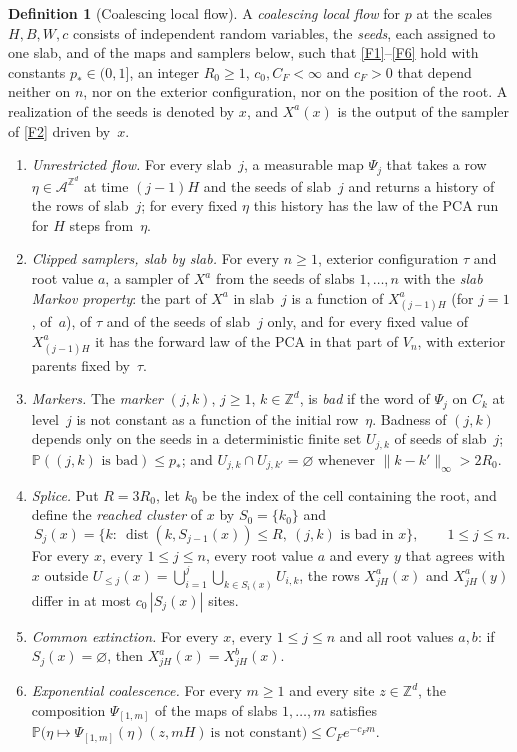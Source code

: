 \documentclass[11pt]{article}
\theoremstyle{plain}
\theoremstyle{definition}
\newtheorem{definition}[theorem]{Definition}
\theoremstyle{remark}
\newcommand{\A}{\mathcal{A}}
\newcommand{\Z}{\mathbb{Z}}
\newcommand{\Prob}{\mathbb{P}}
\newcommand{\dist}{\operatorname{dist}}
\begin{document}
\begin{definition}[Coalescing local flow]
\label{def:flow}
A \emph{coalescing local flow} for $p$ at the scales $H,B,W,c$ consists of independent random variables, the \emph{seeds}, each assigned to one slab, and of the maps and samplers below, such that \ref{F1}--\ref{F6} hold with constants $p_*\in(0,1]$, an integer $R_0\ge1$, $c_0,C_F<\infty$ and $c_F>0$ that depend neither on $n$, nor on the exterior configuration, nor on the position of the root. A realization of the seeds is denoted by $x$, and $X^a(x)$ is the output of the sampler of \ref{F2} driven by~$x$.
\begin{enumerate}[label=(F\arabic*)]
\item\label{F1} \emph{Unrestricted flow.} For every slab~$j$, a measurable map $\Psi_j$ that takes a row $\eta\in\A^{\Z^d}$ at time $(j-1)H$ and the seeds of slab~$j$ and returns a history of the rows of slab~$j$; for every fixed $\eta$ this history has the law of the PCA run for $H$ steps from~$\eta$.
\item\label{F2} \emph{Clipped samplers, slab by slab.} For every $n\ge1$, exterior configuration $\tau$ and root value $a$, a sampler of $X^a$ from the seeds of slabs $1,\dots,n$ with the \emph{slab Markov property}: the part of $X^a$ in slab~$j$ is a function of $X^a_{(j-1)H}$ (for $j=1$, of~$a$), of $\tau$ and of the seeds of slab~$j$ only, and for every fixed value of $X^a_{(j-1)H}$ it has the forward law of the PCA in that part of $V_n$, with exterior parents fixed by~$\tau$.
\item\label{F3} \emph{Markers.} The \emph{marker} $(j,k)$, $j\ge1$, $k\in\Z^d$, is \emph{bad} if the word of $\Psi_j$ on $C_k$ at level~$j$ is not constant as a function of the initial row~$\eta$. Badness of $(j,k)$ depends only on the seeds in a deterministic finite set $U_{j,k}$ of seeds of slab~$j$; $\Prob((j,k)\text{ is bad})\le p_*$; and $U_{j,k}\cap U_{j,k'}=\varnothing$ whenever $\|k-k'\|_\infty>2R_0$.
\item\label{F4} \emph{Splice.} Put $R=3R_0$, let $k_0$ be the index of the cell containing the root, and define the \emph{reached cluster} of $x$ by $S_0=\{k_0\}$ and
\[
S_j(x)=\bigl\{k:\ \dist(k,S_{j-1}(x))\le R,\ (j,k)\text{ is bad in }x\bigr\},\qquad1\le j\le n.
\]
For every $x$, every $1\le j\le n$, every root value $a$ and every $y$ that agrees with $x$ outside $U_{\le j}(x)=\bigcup_{i=1}^j\bigcup_{k\in S_i(x)}U_{i,k}$, the rows $X^a_{jH}(x)$ and $X^a_{jH}(y)$ differ in at most $c_0\,|S_j(x)|$ sites.
\item\label{F5} \emph{Common extinction.} For every $x$, every $1\le j\le n$ and all root values $a,b$: if $S_j(x)=\varnothing$, then $X^a_{jH}(x)=X^b_{jH}(x)$.
\item\label{F6} \emph{Exponential coalescence.} For every $m\ge1$ and every site $z\in\Z^d$, the composition $\Psi_{[1,m]}$ of the maps of slabs $1,\dots,m$ satisfies $\Prob\bigl(\eta\mapsto\Psi_{[1,m]}(\eta)(z,mH)\ \text{is not constant}\bigr)\le C_Fe^{-c_Fm}$.
\end{enumerate}
\end{definition}
\end{document}
